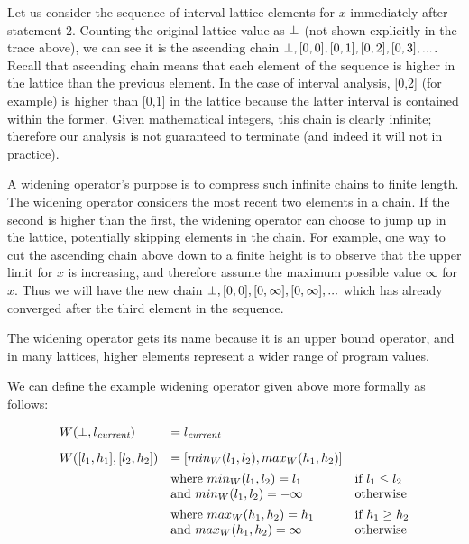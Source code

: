 \documentclass[11pt]{article}
\begin{document}
\begin{sloppypar}
Let us consider the sequence of interval lattice elements for $x$ immediately after statement 2.  Counting the original lattice value as $\bot$ (not shown explicitly in the trace above), we can see it is the ascending chain $\bot, [0,0], [0,1], [0,2], [0,3], ...$.  Recall that ascending chain means that each element of the sequence is higher in the lattice than the previous element.  In the case of interval analysis, [0,2] (for example) is higher than [0,1] in the lattice because the latter interval is contained within the former.  Given mathematical integers, this chain is clearly infinite; therefore our analysis is not guaranteed to terminate (and indeed it will not in practice).

A widening operator's purpose is to compress such infinite chains to finite length.  The widening operator considers the most recent two elements in a chain.  If the second is higher than the first, the widening operator can choose to jump up in the lattice, potentially skipping elements in the chain.  For example, one way to cut the ascending chain above down to a finite height is to observe that the upper limit for $x$ is increasing, and therefore assume the maximum possible value $\infty$ for $x$.  Thus we will have the new chain $\bot, [0,0], [0,\infty], [0,\infty], ...$ which has already converged after the third element in the sequence.

The widening operator gets its name because it is an upper bound operator, and in many lattices, higher elements represent a wider range of program values.

We can define the example widening operator given above more formally as follows:

\[
\begin{array}{lll}

W(\bot,l_\textit{current}) & = l_\textit{current} \\[2ex]
W([l_1,h_1],[l_2,h_2]) & = [min_W(l_1, l_2), max_W(h_1, h_2)] \\[1ex]
& \mbox{where}~ min_W(l_1, l_2) = l_1 & \mbox{if}~ l_1 \le l_2 \\
& \mbox{and}~ min_W(l_1, l_2) = -\infty & \mbox{otherwise} \\[1ex]
& \mbox{where}~ max_W(h_1, h_2) = h_1 & \mbox{if}~ h_1 \ge h_2 \\
& \mbox{and}~ max_W(h_1, h_2) = \infty & \mbox{otherwise} \\

\end{array}
\]


\end{sloppypar}
\end{document}
